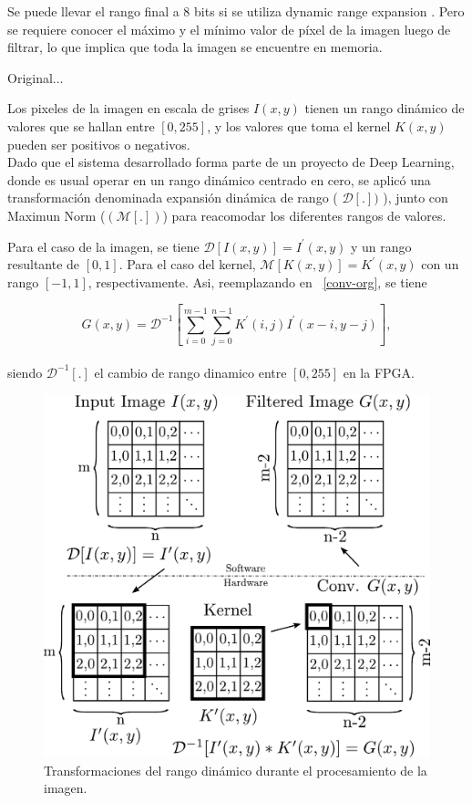 \documentclass[a4paper]{article}
\begin{document}
Se puede llevar el rango final a 8 bits si se utiliza dynamic range expansion
\cite{dinamic_rango}. Pero se requiere conocer el m\'aximo y el m\'inimo valor de p\'ixel
de la imagen luego de filtrar, lo que implica que toda la imagen se encuentre
en memoria.


Original...

Los pixeles de la imagen en escala de grises $I(x,y)$ tienen un rango dinámico de valores que se hallan entre $[0,255]$,
y los valores que toma el kernel $K(x,y)$ pueden ser positivos o negativos.\\
Dado que el sistema desarrollado forma parte de un proyecto de Deep Learning, donde es usual operar en un rango dinámico centrado en cero, se aplicó una transformación denominada  expansión dinámica de rango ( $\mathcal{D}[.])$ ),
junto con Maximun Norm ($(\mathcal{M}[.])$) para reacomodar los diferentes rangos de valores.

Para el caso de la imagen, se tiene $\mathcal{D}[I(x,y)]=I^\prime(x,y)$ y un rango resultante de $[0,1]$.
Para el caso del kernel, $\mathcal{M}[K(x,y)]=K^\prime(x,y)$ con un rango $[-1,1]$, respectivamente.
Asi, reemplazando en ~\eqref{conv-org}, se tiene 



\begin{equation}\label{conv-org1}
  G(x,y) = \mathcal{D}^{-1}\left[\sum_{i=0}^{m-1} \sum_{j=0}^{n-1}K^\prime(i,j)I^\prime(x-i,y-j)\right],
\end{equation}\\
siendo $\mathcal{D}^{-1}[.]$ el cambio de rango dinamico entre $[0,255]$ en la FPGA.

\begin{figure}[H]
\centering
\includegraphics[scale=0.47]{wflow3}
\caption{Transformaciones del rango dinámico durante el procesamiento de la imagen.}
\label{transformation}
\end{figure}
\end{document}
